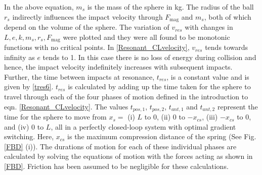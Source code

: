 \documentclass[letterpaper, 10 pt, conference]{ieeeconf}  %
\begin{document}
In the above equation, $m_s$ is the mass of the sphere in kg. The radius of the ball $r_s$ indirectly influences the impact velocity through $F_{\textrm{mag}}$ and $m_s$, both of which depend on the volume of the sphere. The variation of $v_{res}$ with changes in $L,e,k,m_s,r_s,F_{\textrm{mag}}$ were plotted and they were all found to be monotonic functions with no critical points. In \cref{Resonant_CLvelocity}, $v_{res}$ tends towards infinity as $e$ tends to 1. In this case there is no loss of energy during collision and hence, the impact velocity indefinitely increases with subsequent impacts. Further, the time between impacts at resonance, $t_{res}$, is a constant value and is given by \cref{tres6}. $t_{res}$ is calculated by adding up the time taken for the sphere to travel through each of the four phases of motion defined in the introduction to eqn. \ref{Resonant_CLvelocity}. The values $t_{pos,1}$, $t_{pos,2}$, $t_{ant,1}$ and $t_{ant,2}$ represent the time for the sphere to move from $x_s =$ (i) $L$ to 0, (ii) 0 to $-x_{cs}$, (iii) $-x_{cs}$ to 0, and (iv) 0 to $L$, all in a perfectly closed-loop system with optimal gradient switching. Here, $x_{cs}$ is the maximum compression distance of the spring (See Fig. \ref{FBD} (i)). The durations of motion for each of these individual phases are calculated by solving the equations of motion with the forces acting as shown in \cref{FBD}. Friction has been assumed to be negligible for these calculations.
\end{document}
